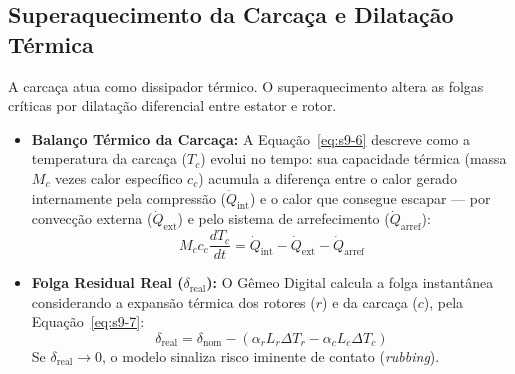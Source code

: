 \documentclass[12pt,a4paper]{article}
\numberwithin{equation}{section}
\numberwithin{table}{section}
\numberwithin{figure}{section}
\begin{document}
	\subsection{\textbf{Superaquecimento da Carcaça e Dilatação Térmica}}
	A carcaça atua como dissipador térmico. O superaquecimento altera as folgas críticas por dilatação diferencial entre estator e rotor.
	\begin{itemize}
		\item \textbf{Balanço Térmico da Carcaça:} A Equação~\eqref{eq:s9-6} descreve como a temperatura da carcaça ($T_c$) evolui no tempo: sua capacidade térmica (massa $M_c$ vezes calor específico $c_c$) acumula a diferença entre o calor gerado internamente pela compressão ($\dot{Q}_{\text{int}}$) e o calor que consegue escapar — por convecção externa ($\dot{Q}_{\text{ext}}$) e pelo sistema de arrefecimento ($\dot{Q}_{\text{arref}}$):
		\begin{equation}\label{eq:s9-6}
 M_c c_c \frac{dT_c}{dt} = \dot{Q}_{\text{int}} - \dot{Q}_{\text{ext}} - \dot{Q}_{\text{arref}}
\end{equation}
		\item \textbf{Folga Residual Real ($\delta_{\text{real}}$):} O Gêmeo Digital calcula a folga instantânea considerando a expansão térmica dos rotores ($r$) e da carcaça ($c$), pela Equação~\eqref{eq:s9-7}:
		\begin{equation}\label{eq:s9-7}
 \delta_{\text{real}} = \delta_{\text{nom}} - (\alpha_r L_r \Delta T_r - \alpha_c L_c \Delta T_c) 
\end{equation}
		Se $\delta_{\text{real}} \to 0$, o modelo sinaliza risco iminente de contato (\textit{rubbing}).
	\end{itemize}
	
\end{document}
